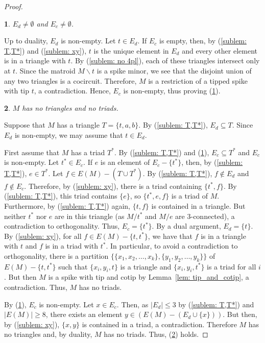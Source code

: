 \documentclass[11pt]{amsart}
\newtheorem{sublemma}{}[theorem]
\numberwithin{equation}{section} %
\begin{document}
\begin{proof}
\begin{sublemma}
\label{sublem: EdEc ne}
$E_d\neq \emptyset$ and $E_c\neq \emptyset$.
\end{sublemma}

Up to duality, $E_d$ is non-empty. Let $t\in E_d$. If $E_c$ is empty, then, by (\ref{sublem: T,T*}) and (\ref{sublem: xy}), $t$ is the unique element in $E_d$ and every other element is in a triangle with $t$. By (\ref{sublem: no 4pl}), each of these triangles intersect only at $t$. Since the matroid $M \backslash t$ is a spike minor, we see that the disjoint union of any two triangles is a cocircuit. Therefore, $M$ is a restriction of a tipped spike with tip $t$, a contradiction. Hence, $E_c$ is non-empty, thus proving (\ref{sublem: EdEc ne}).

\begin{sublemma}
\label{sublem:notriangle}
$M$ has no triangles and no triads.
\end{sublemma}

Suppose that $M$ has a triangle $T=\{t, a, b\}$. By (\ref{sublem: T,T*}), $E_d\subseteq T$. Since $E_d$ is non-empty, we may assume that $t\in E_d$.

First assume that $M$ has a triad $T^*$. By (\ref{sublem: T,T*}) and (\ref{sublem: EdEc ne}), $E_c\subseteq T^*$ and $E_c$ is non-empty. Let $t^*\in E_c$. If $e$ is an element of $E_c-\{t^*\}$, then, by (\ref{sublem: T,T*}), $e\in T^*$. Let $f \in E(M) - (T \cup T^*)$. By (\ref{sublem: T,T*}), $f \notin E_d$ and $f \notin E_c$. Therefore, by (\ref{sublem: xy}), there is a triad containing $\{t^*, f\}$. By (\ref{sublem: T,T*}), this triad contains $\{e\}$, so $\{t^*, e, f\}$ is a triad of $M$. Furthermore, by (\ref{sublem: T,T*}) again, $\{t, f\}$ is contained in a triangle. But neither $t^*$ nor $e$ are in this triangle (as $M / t^*$ and $M / e$ are $3$-connected), a contradiction to orthogonality. Thus, $E_c=\{t^*\}$. By a dual argument, $E_d=\{t\}$. By (\ref{sublem: xy}), for all $f\in E(M)-\{t, t^*\}$, we have that $f$ is in a triangle with $t$ and $f$ is in a triad with $t^*$. In particular, to avoid a contradiction to orthogonality, there is a partition $\{\{x_1, x_2, \ldots, x_k\}, \{y_1, y_2, \ldots, y_k\}\}$ of $E(M)-\{t, t^*\}$ such that $\{x_i, y_i, t\}$ is a triangle and $\{x_i, y_i, t^*\}$ is a triad for all $i$. But then $M$ is a spike with tip and cotip by Lemma~\ref{lem: tip_and_cotip}, a contradiction. Thus, $M$ has no triads.

By (\ref{sublem: EdEc ne}), $E_c$ is non-empty. Let $x\in E_c$. Then, as $|E_d|\le 3$ by (\ref{sublem: T,T*}) and $|E(M)|\ge 8$, there exists an element $y\in (E(M)-(E_d\cup \{x\}))$. But then, by (\ref{sublem: xy}), $\{x, y\}$ is contained in a triad, a contradiction. Therefore $M$ has no triangles and, by duality, $M$ has no triads. Thus, (\ref{sublem:notriangle}) holds.


\end{proof}
\end{document}
